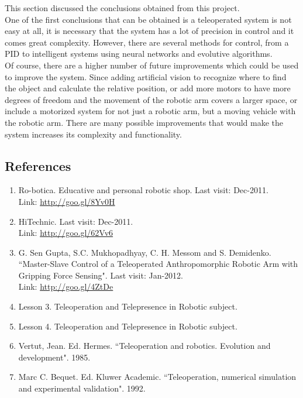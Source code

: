 \documentclass[a4paper,11pt]{article}
\begin{document}
	\begin{multicols}{2}

		
			This section discussed the conclusions obtained from this project.\\

			One of the first conclusions that can be obtained is a teleoperated system is not easy at all, it is necessary that the system has a lot of precision in control and it comes great complexity. However, there are several methods for control, from a PID to intelligent systems using neural networks and evolutive algorithms.\\

			Of course, there are a higher number of future improvements which could be used to improve the system. Since adding artificial vision to recognize where to find the object and calculate the relative position, or add more motors to have more degrees of freedom and the movement of the robotic arm covers a larger space, or include a motorized system for not just a robotic arm, but a moving vehicle with the robotic arm. There are many possible improvements that would make the system increases its complexity and functionality.
		
		\begin{center}
		\section*{References}
		\end{center}
		
			\renewcommand{\labelenumi}{[\theenumi]}
			\begin{enumerate}
				\item Ro-botica. Educative and personal robotic shop. Last visit: Dec-2011.\\
						Link: \href{http://goo.gl/8Yv0H}{http://goo.gl/8Yv0H}
				\item HiTechnic. Last visit: Dec-2011.\\
						Link: \href{http://goo.gl/62Vv6}{http://goo.gl/62Vv6}
				\item G. Sen Gupta, S.C. Mukhopadhyay, C. H. Messom and S. Demidenko. ``Master-Slave Control of a Teleoperated Anthropomorphic Robotic Arm with Gripping Force Sensing". Last visit: Jan-2012.\\
						Link: \href{http://goo.gl/4ZtDe}{http://goo.gl/4ZtDe}
				\item Lesson 3. Teleoperation and Telepresence in Robotic subject.
				\item Lesson 4. Teleoperation and Telepresence in Robotic subject.
				\item Vertut, Jean. Ed. Hermes. ``Teleoperation and robotics. Evolution and development". 1985.
				\item Marc C. Bequet. Ed. Kluwer Academic. ``Teleoperation, numerical simulation and experimental validation". 1992.
			\end{enumerate}

	\end{multicols}
\end{document}
